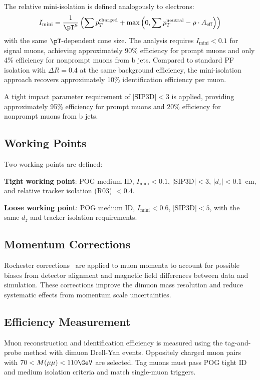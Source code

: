 The relative mini-isolation is defined analogously to electrons:
\begin{equation}
I_{\text{mini}} = \frac{1}{\pT^\mu}\left(\sum p_T^{\text{charged}} + \max\left(0, \sum p_T^{\text{neutral}} - \rho \cdot A_{\text{eff}}\right)\right)
\end{equation}
with the same $\pT$-dependent cone size. The analysis requires $I_{\text{mini}} < 0.1$ for signal muons, achieving approximately 90\% efficiency for prompt muons and only 4\% efficiency for nonprompt muons from b jets. Compared to standard PF isolation with $\Delta R = 0.4$ at the same background efficiency, the mini-isolation approach recovers approximately 10\% identification efficiency per muon.

A tight impact parameter requirement of $|\text{SIP3D}| < 3$ is applied, providing approximately 95\% efficiency for prompt muons and 20\% efficiency for nonprompt muons from b jets.

\subsection{Working Points}

Two working points are defined:

\textbf{Tight working point}: POG medium ID, $I_{\text{mini}} < 0.1$, $|\text{SIP3D}| < 3$, $|d_z| < 0.1$~cm, and relative tracker isolation (R03) $< 0.4$.

\textbf{Loose working point}: POG medium ID, $I_{\text{mini}} < 0.6$, $|\text{SIP3D}| < 5$, with the same $d_z$ and tracker isolation requirements.

\subsection{Momentum Corrections}

Rochester corrections~\cite{RochCorr} are applied to muon momenta to account for possible biases from detector alignment and magnetic field differences between data and simulation. These corrections improve the dimuon mass resolution and reduce systematic effects from momentum scale uncertainties.

\subsection{Efficiency Measurement}

Muon reconstruction and identification efficiency is measured using the tag-and-probe method with dimuon Drell-Yan events. Oppositely charged muon pairs with $70 < M(\mu\mu) < 110\GeV$ are selected. Tag muons must pass POG tight ID and medium isolation criteria and match single-muon triggers.


